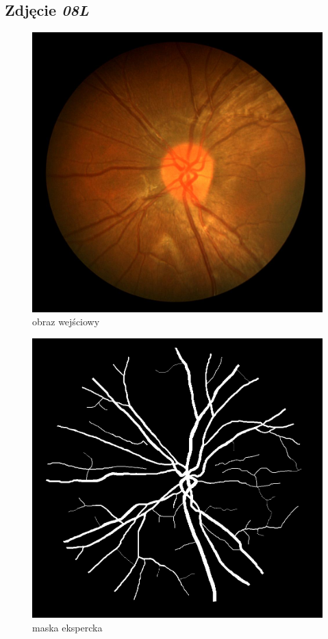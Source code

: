 \documentclass[polish,polish,a4paper]{article}
\begin{document}






		\subsection{Zdjęcie \textit{08L}}

\begin{figure}[!h]
	\centering
	\begin{minipage}{0.26\linewidth}
		\includegraphics[width=\linewidth]{../chase/Image_08L.jpg}
		\centering
			\small{obraz wejściowy}
	\end{minipage}
	\hfill
	\begin{minipage}{0.26\linewidth}
		\includegraphics[width=\linewidth]{../chase/Image_08L_1stHO.png}
		\centering
			\small{maska ekspercka}
	\end{minipage}
\end{figure}
\end{document}
